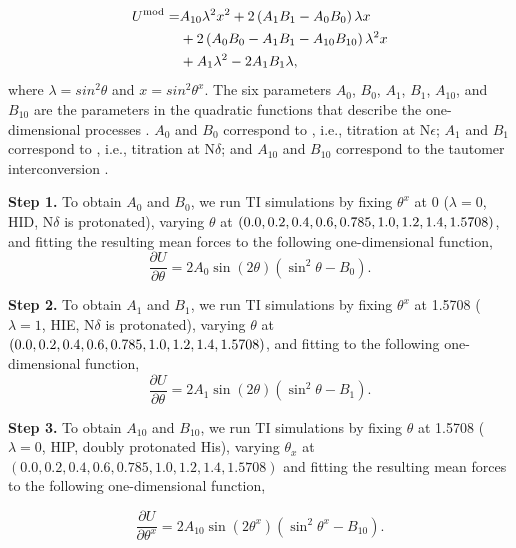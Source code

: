 \begin{align}
U^{\rm mod}= & A_{10}\lambda^{2}x^{2}+2\left(A_{1}B_{1}-A_{0}B_{0}\right)\lambda x \nonumber \\ & + 2\left(A_{0}B_{0}-A_{1}B_{1}-A_{10}B_{10}\right)\lambda^{2}x \nonumber \\ & + A_{1}\lambda^{2}-2A_{1}B_{1}\lambda,
\label{eq:PMF_his}
\end{align}
where $\lambda=sin^2\theta$ and $x=sin^2\theta^x$. 
The six parameters $A_{0}$, $B_{0}$, $A_{1}$,  $B_{1}$, $A_{10}$, and $B_{10}$ are the parameters
in the quadratic functions
that describe the one-dimensional processes
\cite{Khandogin_Brooks_2005_Biophys.J.}.
$A_0$ and $B_0$ correspond to ,
i.e., titration at N$\epsilon$;
$A_1$ and $B_1$ correspond to ,
i.e., titration at N$\delta$;
and $A_{10}$ and $B_{10}$ correspond to the tautomer interconversion .


\textbf{Step 1.}
To obtain $A_0$ and $B_0$, we 
run TI simulations by fixing
$\theta^{x}$ at 0 ($\lambda=0$, HID, N$\delta$ is protonated), varying
$\theta$ at $\left(0.0,0.2,0.4,0.6,\\
0.785,1.0,1.2,1.4,1.5708\right)$, and fitting
the resulting mean forces to the following one-dimensional function,
\begin{equation}
    \frac{\partial U}{\partial\theta}=2A_{0}\sin\left(2\theta\right)\left(\sin^{2}\theta-B_{0}\right).
\end{equation}

\textbf{Step 2.}
To obtain $A_1$ and $B_1$,
we run TI simulations by fixing
$\theta^{x}$ at 1.5708 ($\lambda=1$, HIE, N$\delta$ is protonated), varying
$\theta$ at $\left(0.0,0.2,0.4,0.6,\\
0.785,1.0,1.2,1.4,1.5708\right)$, and 
fitting
 to the following one-dimensional function,
\begin{equation}
    \frac{\partial U}{\partial\theta}=2A_{1}\sin\left(2\theta\right)\left(\sin^{2}\theta-B_{1}\right).
\end{equation}

\textbf{Step 3.}
To obtain $A_{10}$ and $B_{10}$, we run TI simulations by fixing $\theta$ at 1.5708
($\lambda=0$, HIP, doubly protonated His),
varying $\theta_{x}$ at $\left(0.0,0.2,0.4,0.6,0.785,1.0,1.2,1.4,1.5708\right)$ 
and fitting the resulting mean forces
 to the following one-dimensional function,

\begin{equation}
    \frac{\partial U}{\partial\theta^{x}}=2A_{10}\sin\left(2\theta^{x}\right)\left(\sin^{2}\theta^{x}-B_{10}\right).
\end{equation}

